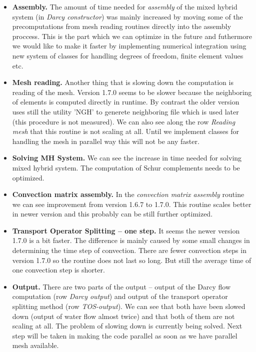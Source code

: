 \begin{itemize}
\item \textbf{Assembly.} The amount of time needed for \emph{assembly} of the mixed hybrid system (in \emph{Darcy constructor}) 
was mainly increased by moving some of the precomputations from mesh reading routines directly into the assembly proccess. 
This is the part which we can optimize in the future and futhermore we would like to make it faster by implementing numerical 
integration using new system of classes for handling degrees of freedom, finite element values etc.

\item \textbf{Mesh reading.} Another thing that is slowing down the computation is reading of the mesh. Version 1.7.0 seems 
to be slower because the neighboring of elements is computed directly in runtime. By contrast the older version uses still 
the utility 'NGH' to generete neighboring file which is used later (this procedure is not measured). We can also see along the 
row \emph{Reading mesh} that this routine is not scaling at all. Until we implement classes for handling the mesh in parallel 
way this will not be any faster.

\item \textbf{Solving MH System.} We can see the increase in time needed for solving mixed hybrid system. The computation 
of Schur complements needs to be optimized.

\item \textbf{Convection matrix assembly.}
In the \emph{convection matrix assembly} routine we can see improvement from version 1.6.7 to 1.7.0. This routine scales better in
newer version and this probably can be still further optimized.

\item \textbf{Transport Operator Splitting -- one step.}
It seems the newer version 1.7.0 is a bit faster. The difference is mainly caused by some small 
changes in determining the time step of convection. There are fewer convection steps in version 
1.7.0 so the routine does not last so long. But still the average time of one convection step 
is shorter.

\item \textbf{Output.} There are two parts of the output -- output of the Darcy flow computation (row \emph{Darcy output}) and 
output of the transport operator splitting method (row \emph{TOS-output}). We can see that both have been slowed down 
(output of water flow almost twice) and that both of them are not scaling at all. The problem of
slowing down is currently being solved. Next step will be taken in making the code parallel as 
soon as we have parallel mesh available.

\end{itemize}

